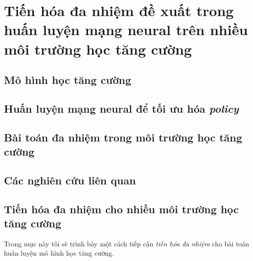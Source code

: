 \chapter{Tiến hóa đa nhiệm đề xuất trong huấn luyện mạng neural trên nhiều môi trường học tăng cường}
\label{chap:problem_rl}
\section{Mô hình học tăng cường}

\section{Huấn luyện mạng neural để tối ưu hóa \emph{policy}}

\section{Bài toán đa nhiệm trong môi trường học tăng cường}

\section{Các nghiên cứu liên quan}

\section{Tiến hóa đa nhiệm cho nhiều môi trường học tăng cường}
Trong mục này tôi sẽ trình bày một cách tiếp cận \emph{tiến hóa đa nhiệm} cho bài toán huấn luyện mô hình học tăng cường.

